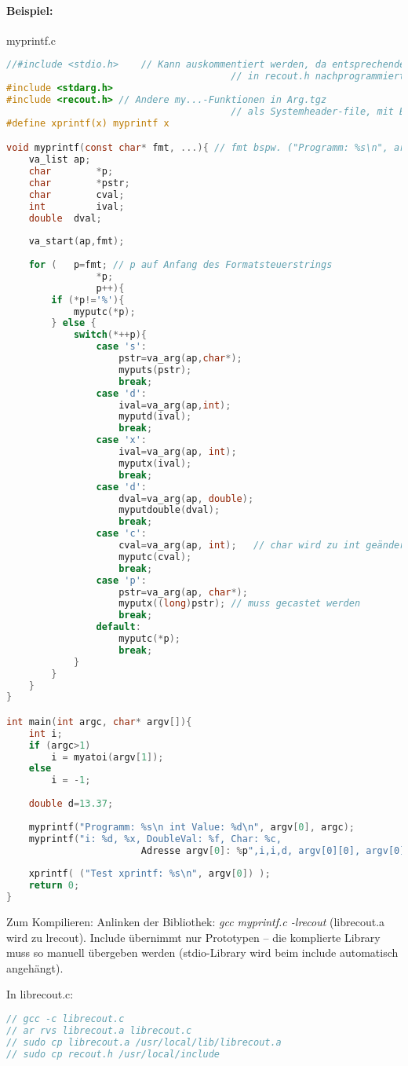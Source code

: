 \paragraph{Beispiel:}
myprintf.c
\begin{lstlisting}[language=C]
//#include <stdio.h>	// Kann auskommentiert werden, da entsprechende Funktionen
										// in recout.h nachprogrammiert wurden.
#include <stdarg.h>
#include <recout.h>	// Andere my...-Funktionen in Arg.tgz
										// als Systemheader-file, mit Befehlen aus librecout.c rein kopiert
#define xprintf(x) myprintf x

void myprintf(const char* fmt, ...){ // fmt bspw. ("Programm: %s\n", argv[0])
	va_list ap;
	char		*p;
	char		*pstr;
	char		cval;
	int			ival;
	double	dval;
	
	va_start(ap,fmt);
	
	for (	p=fmt; // p auf Anfang des Formatsteuerstrings
				*p;
				p++){
		if (*p!='%'){
			myputc(*p);
		} else {
			switch(*++p){
				case 's':
					pstr=va_arg(ap,char*);
					myputs(pstr);
					break;
				case 'd':
					ival=va_arg(ap,int);
					myputd(ival);
					break;
				case 'x':
					ival=va_arg(ap, int);
					myputx(ival);
					break;
				case 'd':
					dval=va_arg(ap, double);
					myputdouble(dval);
					break;
				case 'c':
					cval=va_arg(ap, int);	// char wird zu int geändert
					myputc(cval);
					break;
				case 'p':
					pstr=va_arg(ap, char*);
					myputx((long)pstr);	// muss gecastet werden
					break;
				default:
					myputc(*p);
					break;
			}
		}
	}
}

int main(int argc, char* argv[]){
	int i;
	if (argc>1)
		i = myatoi(argv[1]);
	else
		i = -1;
		
	double d=13.37;
	
	myprintf("Programm: %s\n int Value: %d\n", argv[0], argc);
	myprintf("i: %d, %x, DoubleVal: %f, Char: %c, 
						Adresse argv[0]: %p",i,i,d, argv[0][0], argv[0]);
						
	xprintf( ("Test xprintf: %s\n", argv[0]) );
	return 0;
}
\end{lstlisting}

Zum Kompilieren: Anlinken der Bibliothek: \emph{gcc myprintf.c -lrecout} (librecout.a wird zu lrecout). Include übernimmt nur Prototypen -- die komplierte Library muss so manuell übergeben werden (stdio-Library wird beim include automatisch angehängt).

In librecout.c:
\begin{lstlisting}[language=C]
// gcc -c librecout.c
// ar rvs librecout.a librecout.c
// sudo cp librecout.a /usr/local/lib/librecout.a
// sudo cp recout.h /usr/local/include
\end{lstlisting}

